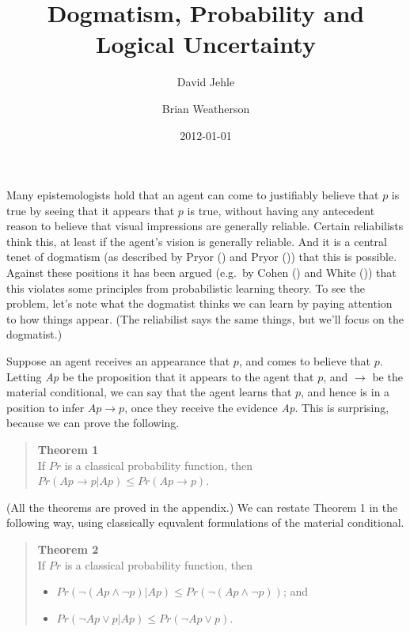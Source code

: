 \documentclass[
  11pt,
  letterpaper,
  DIV=11,
  numbers=noendperiod,
  oneside]{scrartcl}
\title{Dogmatism, Probability and Logical Uncertainty}
\author{David Jehle \and Brian Weatherson}
\date{2012-01-01}
\providecommand{\tightlist}{%
  \setlength{\itemsep}{0pt}\setlength{\parskip}{0pt}}\usepackage{longtable,booktabs,array}
\begin{document}
\maketitle
Many epistemologists hold that an agent can come to justifiably believe
that \(p\) is true by seeing that it appears that \(p\) is true, without
having any antecedent reason to believe that visual impressions are
generally reliable. Certain reliabilists think this, at least if the
agent's vision is generally reliable. And it is a central tenet of
dogmatism (as described by Pryor () and
Pryor ()) that this is possible. Against
these positions it has been argued (e.g.~by Cohen
() and White
()) that this violates some principles
from probabilistic learning theory. To see the problem, let's note what
the dogmatist thinks we can learn by paying attention to how things
appear. (The reliabilist says the same things, but we'll focus on the
dogmatist.)

Suppose an agent receives an appearance that \(p\), and comes to believe
that \(p\). Letting \emph{Ap} be the proposition that it appears to the
agent that \(p\), and \(\rightarrow\) be the material conditional, we
can say that the agent learns that \(p\), and hence is in a position to
infer \(Ap \rightarrow p\), once they receive the evidence
\emph{Ap}. This is surprising, because we can
prove the following.

\begin{quote}
\textbf{Theorem 1}\\
If \(Pr\) is a classical probability function, then\\
\(Pr(Ap \rightarrow p | Ap) \leq Pr(Ap \rightarrow p)\).
\end{quote}

(All the theorems are proved in the appendix.) We can restate Theorem 1
in the following way, using classically equvalent formulations of the
material conditional.

\begin{quote}
\textbf{Theorem 2}\\
If \(Pr\) is a classical probability function, then

\begin{itemize}
\tightlist
\item
  \(Pr(\neg(Ap \wedge \neg p) | Ap) \leq Pr(\neg(Ap \wedge \neg p))\);
  and
\item
  \(Pr(\neg Ap \vee p | Ap) \leq Pr(\neg Ap \vee p)\).
\end{itemize}
\end{quote}
\end{document}
